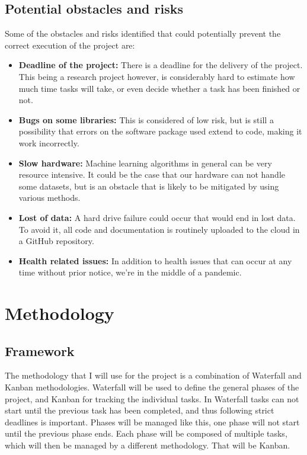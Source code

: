 \subsection{Potential obstacles and risks}

Some of the obstacles and risks identified that could potentially prevent the correct execution of the project are:

\begin{itemize}
    \item \textbf{Deadline of the project:} There is a deadline for the delivery of the project. This being a research project however, is considerably hard to estimate how much time tasks will take, or even decide whether a task has been finished or not.
    \item \textbf{Bugs on some libraries:} This is considered of low risk, but is still a possibility that errors on the software package used extend to code, making it work in\-correctly.
    \item \textbf{Slow hardware:} Machine learning algorithms in general can be very resource intensive. It could be the case that our hardware can not handle some datasets, but is an obstacle that is likely to be mitigated by using various methods. 
    \item \textbf{Lost of data:} A hard drive failure could occur that would end in lost data. To avoid it, all code and documentation is routinely uploaded to the cloud in a GitHub repository.
    \item \textbf{Health related issues:} In addition to health issues that can occur at any time without prior notice, we're in the middle of a pandemic.
\end{itemize}


\section{Methodology}

\subsection{Framework}

The methodology that I will use for the project is a combination of Waterfall and Kanban methodologies. Waterfall will be used to define the general phases of the project, and Kanban for tracking the individual tasks. In Waterfall tasks can not start until the previous task has been completed, and thus following strict deadlines is important. Phases will be managed like this, one phase will not start until the previous phase ends. Each phase will be composed of multiple tasks, which will then be managed by a different methodology. That will be Kanban.

